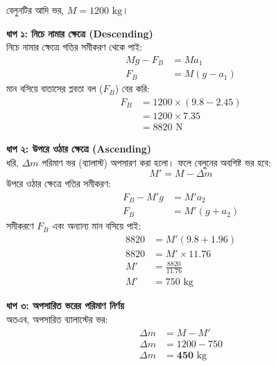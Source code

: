 \documentclass[12pt, a4paper]{article}
\begin{document}
\begin{tcolorbox}[solutionbox={সমাধান (Solution)}]
    \noindent
    বেলুনটির আদি ভর, $M = 1200\text{ kg}$।
    
    \vspace{0.5em}
    \noindent\textbf{ধাপ ১: নিচে নামার ক্ষেত্রে (Descending)} \\
    নিচে নামার ক্ষেত্রে গতির সমীকরণ থেকে পাই:
    \begin{align*}
        Mg - F_B &= M a_1 \\
        F_B &= M (g - a_1)
    \end{align*}
    মান বসিয়ে বাতাসের প্লবতা বল ($F_B$) বের করি:
    \begin{align*}
        F_B &= 1200 \times (9.8 - 2.45) \\
            &= 1200 \times 7.35 \\
            &= 8820\text{ N}
    \end{align*}
    
    \vspace{0.5em}
    \noindent\textbf{ধাপ ২: উপরে ওঠার ক্ষেত্রে (Ascending)} \\
    ধরি, $\Delta m$ পরিমাণ ভর (ব্যালাস্ট) অপসারণ করা হলো। ফলে বেলুনের অবশিষ্ট ভর হবে:
    \[ M' = M - \Delta m \]
    উপরে ওঠার ক্ষেত্রে গতির সমীকরণ:
    \begin{align*}
        F_B - M' g &= M' a_2 \\
        F_B &= M' (g + a_2)
    \end{align*}
    সমীকরণে $F_B$ এবং অন্যান্য মান বসিয়ে পাই:
    \begin{align*}
        8820 &= M' (9.8 + 1.96) \\
        8820 &= M' \times 11.76 \\
        M' &= \frac{8820}{11.76} \\
        M' &= 750\text{ kg}
    \end{align*}
    
    \vspace{0.5em}
    \noindent\textbf{ধাপ ৩: অপসারিত ভরের পরিমাণ নির্ণয়} \\
    অতএব, অপসারিত ব্যালাস্টের ভর:
    \begin{align*}
        \Delta m &= M - M' \\
        \Delta m &= 1200 - 750 \\
        \Delta m &= \mathbf{450}\text{ kg}
    \end{align*}
\end{tcolorbox}
\end{document}
